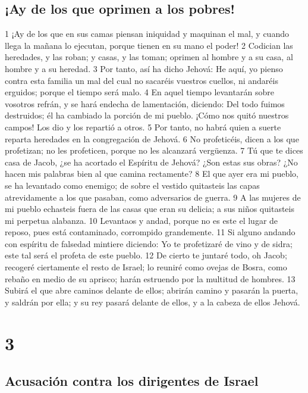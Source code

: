\section*{¡Ay de los que oprimen a los pobres!}

1 ¡Ay de los que en sus camas piensan iniquidad y maquinan el mal, y cuando llega la mañana lo ejecutan, porque tienen en su mano el poder!
2 Codician las heredades, y las roban; y casas, y las toman; oprimen al hombre y a su casa, al hombre y a su heredad.
3 Por tanto, así ha dicho Jehová: He aquí, yo pienso contra esta familia un mal del cual no sacaréis vuestros cuellos, ni andaréis erguidos; porque el tiempo será malo.
4 En aquel tiempo levantarán sobre vosotros refrán, y se hará endecha de lamentación, diciendo: Del todo fuimos destruidos; él ha cambiado la porción de mi pueblo. ¡Cómo nos quitó nuestros campos! Los dio y los repartió a otros.
5 Por tanto, no habrá quien a suerte reparta heredades en la congregación de Jehová.
6 No profeticéis, dicen a los que profetizan; no les profeticen, porque no les alcanzará vergüenza.
7 Tú que te dices casa de Jacob, ¿se ha acortado el Espíritu de Jehová? ¿Son estas sus obras? ¿No hacen mis palabras bien al que camina rectamente?
8 El que ayer era mi pueblo, se ha levantado como enemigo; de sobre el vestido quitasteis las capas atrevidamente a los que pasaban, como adversarios de guerra.
9 A las mujeres de mi pueblo echasteis fuera de las casas que eran su delicia; a sus niños quitasteis mi perpetua alabanza.
10 Levantaos y andad, porque no es este el lugar de reposo, pues está contaminado, corrompido grandemente.
11 Si alguno andando con espíritu de falsedad mintiere diciendo: Yo te profetizaré de vino y de sidra; este tal será el profeta de este pueblo.
12 De cierto te juntaré todo, oh Jacob; recogeré ciertamente el resto de Israel; lo reuniré como ovejas de Bosra, como rebaño en medio de su aprisco; harán estruendo por la multitud de hombres.
13 Subirá el que abre caminos delante de ellos; abrirán camino y pasarán la puerta, y saldrán por ella; y su rey pasará delante de ellos, y a la cabeza de ellos Jehová.

\chapter{3}

\section*{Acusación contra los dirigentes de Israel}

